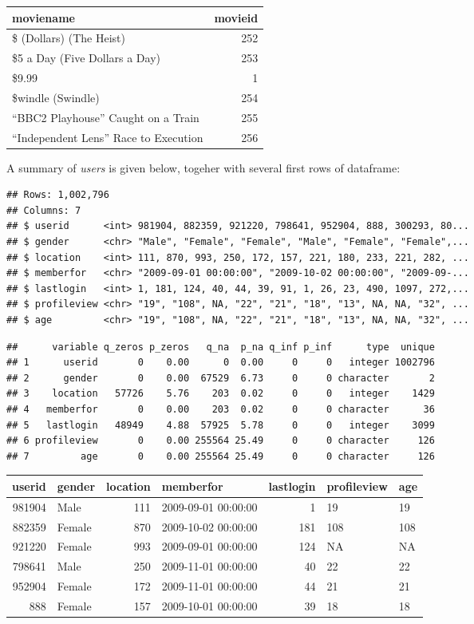 \documentclass[
  12pt,
]{report}
\begin{document}
\begin{longtable}[]{@{}lr@{}}
\toprule
moviename & movieid\tabularnewline
\midrule
\endhead
\$ (Dollars) (The Heist) & 252\tabularnewline
\$5 a Day (Five Dollars a Day) & 253\tabularnewline
\$9.99 & 1\tabularnewline
\$windle (Swindle) & 254\tabularnewline
``BBC2 Playhouse'' Caught on a Train & 255\tabularnewline
``Independent Lens'' Race to Execution & 256\tabularnewline
\bottomrule
\end{longtable}

A summary of \emph{users} is given below, togeher with several first
rows of dataframe:

\begin{verbatim}
## Rows: 1,002,796
## Columns: 7
## $ userid      <int> 981904, 882359, 921220, 798641, 952904, 888, 300293, 80...
## $ gender      <chr> "Male", "Female", "Female", "Male", "Female", "Female",...
## $ location    <int> 111, 870, 993, 250, 172, 157, 221, 180, 233, 221, 282, ...
## $ memberfor   <chr> "2009-09-01 00:00:00", "2009-10-02 00:00:00", "2009-09-...
## $ lastlogin   <int> 1, 181, 124, 40, 44, 39, 91, 1, 26, 23, 490, 1097, 272,...
## $ profileview <chr> "19", "108", NA, "22", "21", "18", "13", NA, NA, "32", ...
## $ age         <chr> "19", "108", NA, "22", "21", "18", "13", NA, NA, "32", ...
\end{verbatim}

\begin{verbatim}
##      variable q_zeros p_zeros   q_na  p_na q_inf p_inf      type  unique
## 1      userid       0    0.00      0  0.00     0     0   integer 1002796
## 2      gender       0    0.00  67529  6.73     0     0 character       2
## 3    location   57726    5.76    203  0.02     0     0   integer    1429
## 4   memberfor       0    0.00    203  0.02     0     0 character      36
## 5   lastlogin   48949    4.88  57925  5.78     0     0   integer    3099
## 6 profileview       0    0.00 255564 25.49     0     0 character     126
## 7         age       0    0.00 255564 25.49     0     0 character     126
\end{verbatim}

\begin{longtable}[]{@{}rlrlrll@{}}
\toprule
userid & gender & location & memberfor & lastlogin & profileview &
age\tabularnewline
\midrule
\endhead
981904 & Male & 111 & 2009-09-01 00:00:00 & 1 & 19 & 19\tabularnewline
882359 & Female & 870 & 2009-10-02 00:00:00 & 181 & 108 &
108\tabularnewline
921220 & Female & 993 & 2009-09-01 00:00:00 & 124 & NA &
NA\tabularnewline
798641 & Male & 250 & 2009-11-01 00:00:00 & 40 & 22 & 22\tabularnewline
952904 & Female & 172 & 2009-11-01 00:00:00 & 44 & 21 &
21\tabularnewline
888 & Female & 157 & 2009-10-01 00:00:00 & 39 & 18 & 18\tabularnewline
\bottomrule
\end{longtable}
\end{document}
